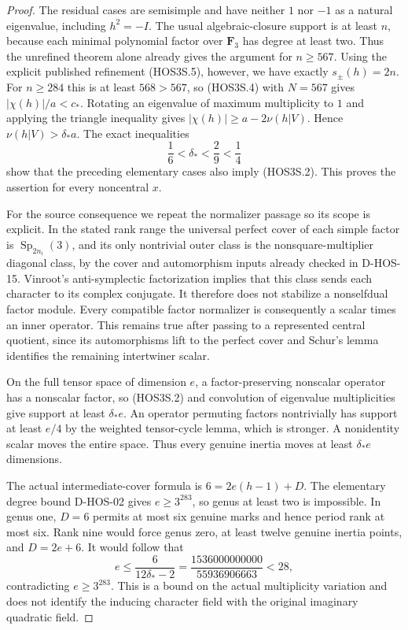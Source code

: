 \begin{proof}
The residual cases are semisimple and have neither $1$ nor $-1$
as a natural eigenvalue, including $h^2=-I$. The usual
algebraic-closure support is at least $n$, because each minimal
polynomial factor over $\mathbf F_3$ has degree at least two.
Thus the unrefined theorem alone already gives the argument for
$n\ge567$. Using the explicit published refinement (HOS3S.5),
however, we have exactly $s_{\pm}(h)=2n$. For $n\ge284$ this
is at least $568>567$, so (HOS3S.4) with $N=567$ gives
$|\chi(h)|/a<c_*$. Rotating an eigenvalue of maximum multiplicity
to $1$ and applying the triangle inequality gives
$|\chi(h)|\ge a-2\nu(h|V)$. Hence $\nu(h|V)>\delta_*a$.
The exact inequalities
\[
                 \frac16<\delta_*<\frac29<\frac14
 \tag{HOS3S.6}
\]
show that the preceding elementary cases also imply (HOS3S.2).
This proves the assertion for every noncentral $x$.

For the source consequence we repeat the normalizer passage so
its scope is explicit. In the stated rank range the universal
perfect cover of each simple factor is $\operatorname{Sp}_{2n_i}(3)$,
and its only nontrivial outer class is the nonsquare-multiplier
diagonal class, by the cover and automorphism inputs already
checked in D-HOS-15. Vinroot's anti-symplectic factorization
implies that this class sends each character to its complex
conjugate. It therefore does not stabilize a nonselfdual factor
module. Every compatible factor normalizer is consequently a
scalar times an inner operator. This remains true after passing
to a represented central quotient, since its automorphisms lift
to the perfect cover and Schur's lemma identifies the remaining
intertwiner scalar.

On the full tensor space of dimension $e$, a factor-preserving
nonscalar operator has a nonscalar factor, so (HOS3S.2) and
convolution of eigenvalue multiplicities give support at least
$\delta_*e$. An operator permuting factors nontrivially has
support at least $e/4$ by the weighted tensor-cycle lemma, which
is stronger. A nonidentity scalar moves the entire space.
Thus every genuine inertia moves at least $\delta_*e$ dimensions.

The actual intermediate-cover formula is
$6=2e(h-1)+D$. The elementary degree bound D-HOS-02 gives
$e\ge3^{283}$, so genus at least two is impossible. In genus
one, $D=6$ permits at most six genuine marks and hence period
rank at most six. Rank nine would force genus zero, at least
twelve genuine inertia points, and $D=2e+6$. It would follow that
\[
 e\le\frac{6}{12\delta_*-2}
   =\frac{1536000000000}{55936906663}<28,
 \tag{HOS3S.7}
\]
contradicting $e\ge3^{283}$. This is a bound on the actual
multiplicity variation and does not identify the inducing
character field with the original imaginary quadratic field.


\end{proof}
